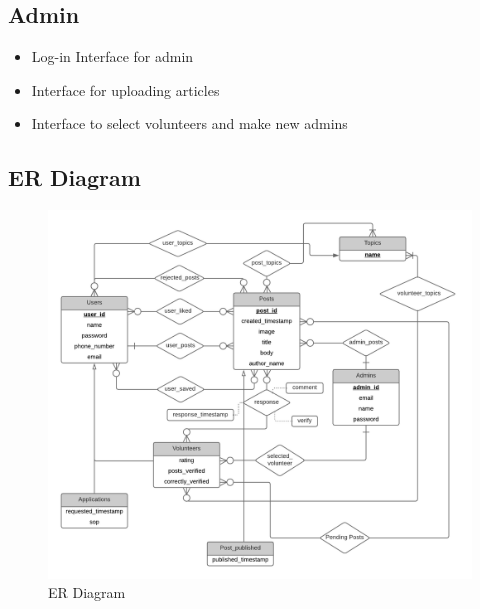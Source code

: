 \documentclass[titlepage,12pt]{article}
\begin{document}
\subsection{Admin}
\begin{itemize}
     \setlength\itemsep{0.3em}
    \item Log-in Interface for admin 
    \item Interface for uploading articles
    \item Interface to select volunteers and make new admins
\end{itemize}
\subsection{ER Diagram}
\begin{figure}[H]
    \centering
    \includegraphics[width=1.1\textwidth]{EntityRelationshipDiagram}
    \caption{ER Diagram}
    \label{fig:er_diagram}
\end{figure}
\newpage
\end{document}
